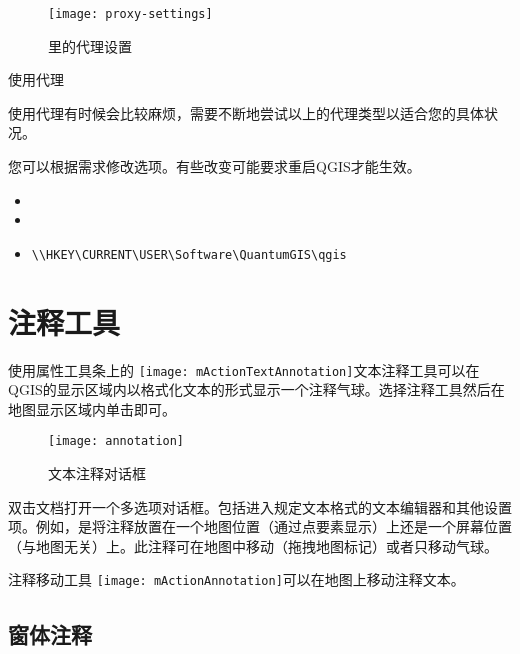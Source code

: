 \begin{figure}[ht]
   \centering
   \texttt{[image: proxy-settings]}
   \caption{\qg 里的代理设置 \nixcaption}
   \label{fig:proxy-settings}
\end{figure}

\begin{Tip} \caption{\textsc{使用代理}}
使用代理有时候会比较麻烦，需要不断地尝试以上的代理类型以适合您的具体状况。
\end{Tip}

您可以根据需求修改选项。有些改变可能要求重启QGIS才能生效。

\begin{itemize}
\item {}
\item {}
\item {}
\begin{verbatim}
\\HKEY\CURRENT\USER\Software\QuantumGIS\qgis
\end{verbatim}
\end{itemize}

\section{注释工具}\label{sec:annotations}

使用属性工具条上的 \texttt{[image: mActionTextAnnotation]}文本注释工具可以在QGIS的显示区域内以格式化文本的形式显示一个注释气球。选择注释工具然后在地图显示区域内单击即可。

\begin{figure}[ht]
   \centering
   \texttt{[image: annotation]}
   \caption{文本注释对话框 \nixcaption}
   \label{fig:annotation}
\end{figure}

双击文档打开一个多选项对话框。包括进入规定文本格式的文本编辑器和其他设置项。例如，是将注释放置在一个地图位置（通过点要素显示）上还是一个屏幕位置（与地图无关）上。此注释可在地图中移动（拖拽地图标记）或者只移动气球。

注释移动工具 \texttt{[image: mActionAnnotation]}可以在地图上移动注释文本。

\subsection{窗体注释}

